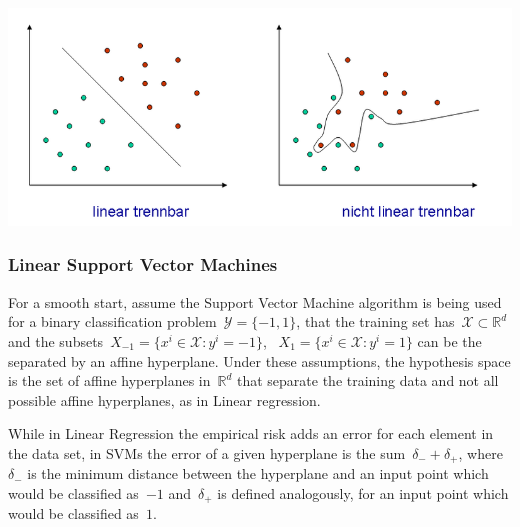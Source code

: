 \includegraphics[scale=0.5]{Images/svm.png}


\subsubsection{Linear Support Vector Machines}

For a smooth start, assume the Support Vector Machine algorithm is being used for a binary classification problem~$\mathcal{Y} = \{-1, 1\}$, that the training set has~$\mathcal{X} \subset \mathbb{R}^d$ and the subsets~$X_{-1} = \{ x^i\in \mathcal{X} \colon y^i = -1 \}$, ~$X_{1} = \{ x^i\in \mathcal{X} \colon y^i = 1 \}$ can be the separated by an affine hyperplane. Under these assumptions, the hypothesis space is the set of affine hyperplanes in~$\mathbb{R}^d$ that separate the training data and not all possible affine hyperplanes, as in Linear regression.

While in Linear Regression the empirical risk adds an error for each element in the data set, in SVMs the error of a given hyperplane is the sum~$\delta_{-} + \delta_{+}$, where~$\delta_{-}$ is the minimum distance between the hyperplane and an input point which would be classified as~$-1$ and~$\delta_{+}$ is defined analogously, for an input point which would be classified as~$1$.


